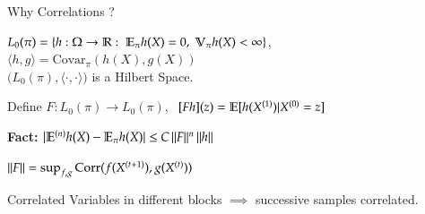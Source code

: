 \documentclass[serif,mathserif,final]{beamer}
\newcommand{\itemlinespace}{0.3in}
\newcommand{\insertlinespace}{\vspace{\itemlinespace}}
\begin{document}
\begin{frame}{}
\begin{columns}[t]
\begin{column}{0.49\linewidth}
\begin{block}{\Huge Why Correlations ?}
{      $L_0(\pi) = \{ h:\Omega \rightarrow \mathbb{R} :\; \mathbb{E}_{\pi} h(X) = 0, \;
                        \mathbb{V}_{\pi}h(X) < \infty \}$, \hspace{0.1in}
      $\langle h, g \rangle = \text{Covar}_\pi(h(X), g(X))$ \\
      $\big(L_0(\pi), \langle \cdot, \cdot \rangle \big)$ is a Hilbert Space.
      \insertlinespace

      Define $F:L_0(\pi) \rightarrow L_0(\pi)$,
        $ \,\; [Fh](z) = \mathbb{E}[h(X^{(1)}) | X^{(0)} = z]$ \\
      \insertlinespace
 
      \textbf{Fact:}
      $| \mathbb{E}^{(n)} h(X) - \mathbb{E}_\pi h(X) | \leq C \, \|F\|^n \, \|h\|$
      \insertlinespace

      $\|F\| = \sup_{f,g} \text{Corr}(f(X^{(t+1)}), g(X^{(t)}))$
      \insertlinespace

      Correlated Variables in different blocks $\implies$ successive
      samples correlated. \\
      \insertlinespace

}
\end{block}
\end{column}
\end{columns}
\end{frame}
\end{document}
